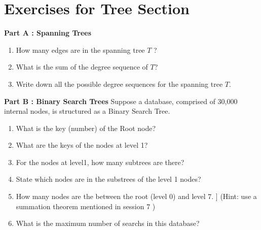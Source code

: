 \section{Exercises for Tree Section}
\begin{frame}
\textbf{Part A : Spanning Trees}
\begin{enumerate}
\item How many edges are in the spanning tree $T$ ?
\item What is the sum of the degree sequence of $T$?
\item Write down all the possible degree sequences for the spanning tree $T$.
\end{enumerate}
\end{frame}
\begin{frame}
\textbf{Part B : Binary Search Trees}
Suppose a database, comprised of 30,000 internal nodes, is structured as a Binary Search Tree.

\begin{enumerate}
\item What is the key (number) of the Root node?
\item What are the keys of the nodes at level 1?
\item For the nodes at level1, how many subtrees are there?
\item State which nodes are in the substrees of the level 1 nodes?
\item How many nodes are the between the root (level 0) and level 7. ]
(Hint: use a summation theorem mentioned in session 7 )
\item What is the maximum number of searchs in this database?
\end{enumerate}

\end{frame}
